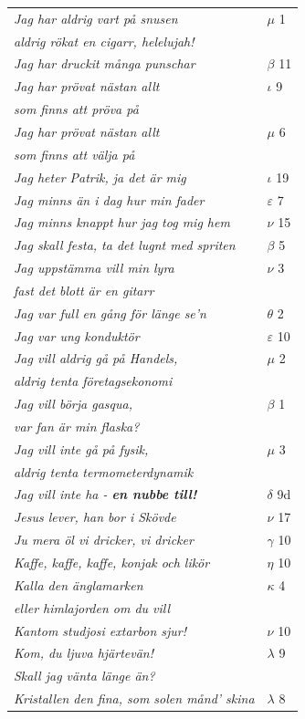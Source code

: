 \documentclass[a6paper,10pt]{article}
\begin{document}
\newpage
\begin{table}[!h]
\begin{tabular}{l l}
\textit{Jag har aldrig vart på snusen}	&$\mu$ 1\\
\textit{aldrig rökat en cigarr, helelujah!} &\\
\textit{Jag har druckit många punschar}	&$\beta$ 11\\
\textit{Jag har prövat nästan allt}	&$\iota$ 9\\
\textit{som finns att pröva på} &\\
\textit{Jag har prövat nästan allt }	&$\mu$ 6\\
\textit{som finns att välja på} &\\
\textit{Jag heter Patrik, ja det är mig}&$\iota$ 19\\
\textit{Jag minns än i dag hur min fader}	&$\varepsilon$ 7\\
\textit{Jag minns knappt hur jag tog mig hem}	&$\nu$ 15\\
\textit{Jag skall festa, ta det lugnt med spriten}	&$\beta$ 5\\
\textit{Jag uppstämma vill min lyra}	&$\nu$ 3\\
\textit{fast det blott är en gitarr} &\\
\textit{Jag var full en gång för länge se'n}	&$\theta$ 2\\
\textit{Jag var ung konduktör}	&$\varepsilon$ 10\\
\textit{Jag vill aldrig gå på Handels,}	&$\mu$ 2\\
\textit{aldrig tenta företagsekonomi} &\\
\textit{Jag vill börja gasqua,}	&$\beta$ 1\\
\textit{var fan är min flaska?} &\\
\textit{Jag vill inte gå på fysik,}	&$\mu$ 3\\
\textit{aldrig tenta termometerdynamik} &\\
\textit{Jag vill inte ha - \textbf{en nubbe till!}}	&$\delta$ 9d\\
\textit{Jesus lever, han bor i Skövde} &$\nu$ 17\\
\textit{Ju mera öl vi dricker, vi dricker}	&$\gamma$ 10\\
\textit{Kaffe, kaffe, kaffe, konjak och likör}	&$\eta$ 10\\
\textit{Kalla den änglamarken}	&$\kappa$ 4\\
\textit{eller himlajorden om du vill} &\\
\textit{Kantom studjosi extarbon sjur!}	&$\nu$ 10\\
\textit{Kom, du ljuva hjärtevän!}	&$\lambda$ 9\\
\textit{Skall jag vänta länge än?} &\\
\textit{Kristallen den fina, som solen månd' skina}	&$\lambda$ 8\\
\end{tabular}
\end{table}
\end{document}
